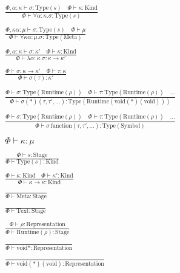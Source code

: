 \documentclass {article}
\begin{document}
\begin{gather*}
\\
\frac
{\Phi, \alpha : \kappa \vdash \sigma : \text{Type}(s) \quad \Phi \vdash \kappa : \text{Kind}}
{\Phi \vdash \forall \alpha : \kappa. \sigma : \text{Type} (s) } \\
\\
\frac
{\Phi, \kappa \alpha : \mu \vdash \sigma : \text{Type} (s) \quad \Phi \vdash \mu  }
{\Phi \vdash \forall \kappa \alpha : \mu. \sigma : \text{Type} (\text{Meta}) } \\
\\
\frac
{\Phi, \alpha : \kappa \vdash \sigma : \kappa' \quad \Phi \vdash \kappa : \text{Kind}} 
{\Phi \vdash \lambda \alpha : \kappa. \sigma : \kappa \to \kappa' } \\
\\
\frac
{\Phi \vdash \sigma : \kappa \to \kappa' \quad \Phi \vdash \tau : \kappa}
{\Phi \vdash \sigma (\tau) : \kappa' } \\
\\
\frac
{\Phi \vdash \sigma : \text{Type} (\text{Runtime} (\rho)) \quad \Phi \vdash \tau : \text{Type} (\text{Runtime} (\rho)) \quad \dots}
{\Phi \vdash \sigma (*) (\tau, \tau', \dots) : \text{Type} (\text{Runtime} (\text{void}(*)(\text{void})))} \\
\\
\frac
{\Phi \vdash \sigma : \text{Type} (\text{Runtime} (\rho)) \quad \Phi \vdash \tau : \text{Type} (\text{Runtime} (\rho)) \quad \dots}
{\Phi \vdash \sigma \, \text{function} (\tau, \tau', \dots) : \text{Type} (\text{Symbol})} \\
\\
\Phi \vdash \kappa : \mu \tag*{[Kind Validation]} \\
\\
\frac
{\Phi \vdash s : \text{Stage}}
{\Phi \vdash \text {Type} (s) : \text{Kind}} \\
\\
\frac
{\Phi \vdash \kappa : \text{Kind} \quad \Phi \vdash \kappa' : \text{Kind}}
{\Phi \vdash \kappa \to \kappa : \text{Kind} } \\
\\
\frac
{}
{\Phi \vdash \text{Meta} : \text{Stage}} \\
\\
\frac
{}
{\Phi \vdash \text{Text} : \text{Stage}} \\
\\
\frac
{\Phi \vdash \rho : \text{Representation}}
{\Phi \vdash \text{Runtime} (\rho) : \text{Stage}} \\
\\
\frac
{}
{\Phi \vdash \text{void}* : \text{Representation}} \\
\\
\frac
{}
{\Phi \vdash \text{void}(*)(\text{void}) : \text{Representation}}
\end{gather*}
\end{document}

